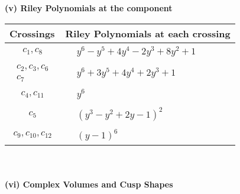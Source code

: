 \documentclass[1p]{elsarticle_modified}
\theoremstyle{definition}
\begin{document}
\newpage\renewcommand{\arraystretch}{1}
\flushleft \textbf{(v) Riley Polynomials at the component}\newline \\
\begin{tabular}{m{50pt}|m{274pt}}
Crossings & \hspace{64pt}Riley Polynomials at each crossing \\
\hline $$\begin{aligned}c_{1},c_{8}\end{aligned}$$&$\begin{aligned}
&y^6- y^5+4 y^4-2 y^3+8 y^2+1
\end{aligned}$\\
\hline $$\begin{aligned}c_{2},c_{3},c_{6}\\c_{7}\end{aligned}$$&$\begin{aligned}
&y^6+3 y^5+4 y^4+2 y^3+1
\end{aligned}$\\
\hline $$\begin{aligned}c_{4},c_{11}\end{aligned}$$&$\begin{aligned}
&y^6
\end{aligned}$\\
\hline $$\begin{aligned}c_{5}\end{aligned}$$&$\begin{aligned}
&(y^3- y^2+2 y-1)^2
\end{aligned}$\\
\hline $$\begin{aligned}c_{9},c_{10},c_{12}\end{aligned}$$&$\begin{aligned}
&(y-1)^6
\end{aligned}$\\
\hline
\end{tabular}\\~\\
\newpage\flushleft \textbf{(vi) Complex Volumes and Cusp Shapes}
\end{document}

